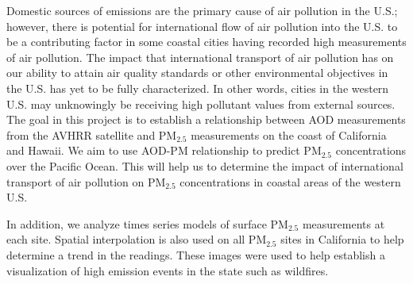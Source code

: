 \documentclass[10pt]{article}
\begin{document}
Domestic sources of emissions are the primary cause of air pollution in the U.S.; however, there is potential for international flow of air pollution into the U.S. to be a contributing factor in some coastal cities having recorded high measurements of air pollution. The impact that international transport of air pollution has on our ability to attain air quality standards or other environmental objectives in the U.S. has yet to be fully characterized. In other words, cities in the western U.S. may unknowingly be receiving high pollutant values from external sources. The goal in this project is to establish a relationship between AOD measurements from the AVHRR satellite and PM$_{2.5}$ measurements on the coast of California and Hawaii. We aim to use AOD-PM relationship to predict PM$_{2.5}$ concentrations over the Pacific Ocean. This will help us to determine the impact of international transport of air pollution on PM$_{2.5}$ concentrations in coastal areas of the western U.S. 

In addition, we analyze times series models of surface PM$_{2.5}$ measurements at each site. Spatial interpolation is also used on all PM$_{2.5}$ sites in California to help determine a trend in the readings. These images were used to help establish a visualization of high emission events in the state such as wildfires.
\end{document}
